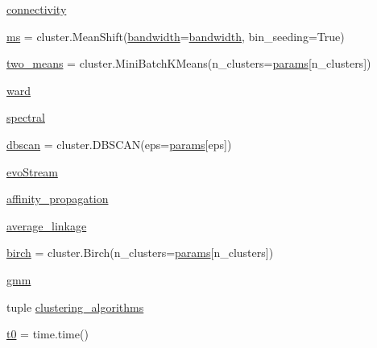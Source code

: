 \begin{DoxyCompactItemize}
\item 
\hyperlink{namespaceplot__cluster__comparison_a93f46d7986787bc24cee7801a0d30954}{connectivity}
\item 
\hyperlink{namespaceplot__cluster__comparison_ae1c9ec5b0bfb5adab345a4e652f80eaa}{ms} = cluster.\+Mean\+Shift(\hyperlink{namespaceplot__cluster__comparison_a3628421ec7ed08e955e49826b638402b}{bandwidth}=\hyperlink{namespaceplot__cluster__comparison_a3628421ec7ed08e955e49826b638402b}{bandwidth}, bin\+\_\+seeding=True)
\item 
\hyperlink{namespaceplot__cluster__comparison_a0e062129f02c2e5431730b2c9728faf8}{two\+\_\+means} = cluster.\+Mini\+Batch\+K\+Means(n\+\_\+clusters=\hyperlink{namespaceplot__cluster__comparison_a5afe27ff875351ace28865d50f61c56a}{params}\mbox{[}\textquotesingle{}n\+\_\+clusters\textquotesingle{}\mbox{]})
\item 
\hyperlink{namespaceplot__cluster__comparison_a8c73d7edecd47d7b3a32447d9c8a9f32}{ward}
\item 
\hyperlink{namespaceplot__cluster__comparison_a27b314b7c2137c1d0299a33e63293ec9}{spectral}
\item 
\hyperlink{namespaceplot__cluster__comparison_a1104a5ca141007136247a905c8d03d9d}{dbscan} = cluster.\+D\+B\+S\+C\+AN(eps=\hyperlink{namespaceplot__cluster__comparison_a5afe27ff875351ace28865d50f61c56a}{params}\mbox{[}\textquotesingle{}eps\textquotesingle{}\mbox{]})
\item 
\hyperlink{namespaceplot__cluster__comparison_a491827f5dfe21e52aecea99d044bf46d}{evo\+Stream}
\item 
\hyperlink{namespaceplot__cluster__comparison_a44fd5ccc0a17d8338c014bd8a51e4292}{affinity\+\_\+propagation}
\item 
\hyperlink{namespaceplot__cluster__comparison_a85d29d2dbcec5c46b4b3dbc72f6185a3}{average\+\_\+linkage}
\item 
\hyperlink{namespaceplot__cluster__comparison_ad452edfafde1162ed2eae9d7fd575f77}{birch} = cluster.\+Birch(n\+\_\+clusters=\hyperlink{namespaceplot__cluster__comparison_a5afe27ff875351ace28865d50f61c56a}{params}\mbox{[}\textquotesingle{}n\+\_\+clusters\textquotesingle{}\mbox{]})
\item 
\hyperlink{namespaceplot__cluster__comparison_acdc478c15e02ee0fd3f5fb190d6e7d17}{gmm}
\item 
tuple \hyperlink{namespaceplot__cluster__comparison_a11980a91d1ed10bf862a103ff8f9990a}{clustering\+\_\+algorithms}
\item 
\hyperlink{namespaceplot__cluster__comparison_a7f7a3efbc136aeea39a1115ea80d6333}{t0} = time.\+time()

\end{DoxyCompactItemize}
